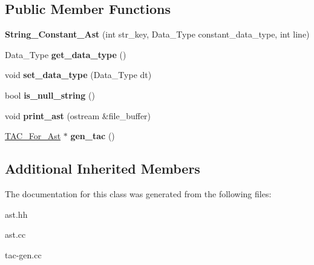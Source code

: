 \subsection*{Public Member Functions}
\begin{DoxyCompactItemize}
\item 
\mbox{\label{classString__Constant__Ast_a50a3fbfa7f9344799728e4b72584dd72}} 
{\bfseries String\+\_\+\+Constant\+\_\+\+Ast} (int str\+\_\+key, Data\+\_\+\+Type constant\+\_\+data\+\_\+type, int line)
\item 
\mbox{\label{classString__Constant__Ast_ac21ae9b7139eec5255f70523b4be8af2}} 
Data\+\_\+\+Type {\bfseries get\+\_\+data\+\_\+type} ()
\item 
\mbox{\label{classString__Constant__Ast_a1883b965e96db1c9763f5bdbd00736e3}} 
void {\bfseries set\+\_\+data\+\_\+type} (Data\+\_\+\+Type dt)
\item 
\mbox{\label{classString__Constant__Ast_a277f2e11ca26cf1b0a148811316a2f67}} 
bool {\bfseries is\+\_\+null\+\_\+string} ()
\item 
\mbox{\label{classString__Constant__Ast_a79963b67fa468310f119480672a28872}} 
void {\bfseries print\+\_\+ast} (ostream \&file\+\_\+buffer)
\item 
\mbox{\label{classString__Constant__Ast_abaad7f2f9bfdd10d9a264c7179d98dfe}} 
\hyperlink{classTAC__For__Ast}{T\+A\+C\+\_\+\+For\+\_\+\+Ast} $\ast$ {\bfseries gen\+\_\+tac} ()
\end{DoxyCompactItemize}
\subsection*{Additional Inherited Members}


The documentation for this class was generated from the following files\+:\begin{DoxyCompactItemize}
\item 
ast.\+hh\item 
ast.\+cc\item 
tac-\/gen.\+cc\end{DoxyCompactItemize}
